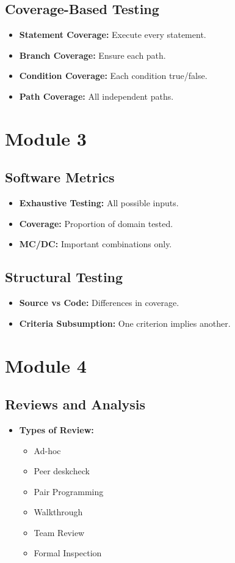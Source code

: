 \documentclass[10pt,portrait]{article}
\begin{document}
\begin{multicols}{ 3 }
\subsection*{Coverage-Based Testing}
\begin{itemize}
    \item \textbf{Statement Coverage:} Execute every statement.
    \item \textbf{Branch Coverage:} Ensure each path.
    \item \textbf{Condition Coverage:} Each condition true/false.
    \item \textbf{Path Coverage:} All independent paths.
\end{itemize}

\section*{Module 3}
\subsection*{Software Metrics}
\begin{itemize}
    \item \textbf{Exhaustive Testing:} All possible inputs.
    \item \textbf{Coverage:} Proportion of domain tested.
    \item \textbf{MC/DC:} Important combinations only.
\end{itemize}

\subsection*{Structural Testing}
\begin{itemize}
    \item \textbf{Source vs Code:} Differences in coverage.
    \item \textbf{Criteria Subsumption:} One criterion implies another.
\end{itemize}

\section*{Module 4}
\subsection*{Reviews and Analysis}
\begin{itemize}
    \item \textbf{Types of Review:}
    \begin{itemize}
        \item Ad-hoc
        \item Peer deskcheck
        \item Pair Programming
        \item Walkthrough
        \item Team Review
        \item Formal Inspection
    \end{itemize}
\end{itemize}


\end{multicols}
\end{document}
